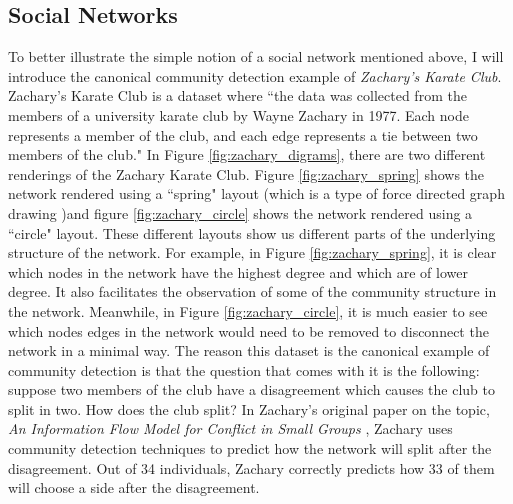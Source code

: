 \subsection{Social Networks}\label{sec:Social Networks}
To better illustrate the simple notion of a social network mentioned above, I will introduce the canonical community detection example of \emph{Zachary's Karate Club}. Zachary's Karate Club is a dataset where ``the data was collected from the members of a university karate club by Wayne Zachary in 1977.  Each node represents a member of the club, and each edge represents a tie between two members of the club." \cite[Metadata]{konect:2017:ucidata-zachary} In Figure \ref{fig:zachary_digrams}, there are two different renderings of the Zachary Karate Club. Figure \ref{fig:zachary_spring} shows the network rendered using a ``spring" layout (which is a type of force directed graph drawing \cite{kobourov12})and figure \ref{fig:zachary_circle} shows the network rendered using a ``circle" layout. These different layouts show us different parts of the underlying structure of the network. For example, in Figure \ref{fig:zachary_spring}, it is clear which nodes in the network have the highest degree and which are of lower degree. It also facilitates the observation of some of the community structure in the network. Meanwhile, in Figure \ref{fig:zachary_circle}, it is much easier to see which nodes edges in the network would need to be removed to disconnect the network in a minimal way. The reason this dataset is the canonical example of community detection is that the question that comes with it is the following: suppose two members of the club have a disagreement which causes the club to split in two. How does the club split? In Zachary's original paper on the topic, \emph{An Information Flow Model for Conflict in Small Groups} \cite{konect:ucidata-zachary}, Zachary uses community detection techniques to predict how the network will split after the disagreement. Out of 34 individuals, Zachary correctly predicts how 33 of them will choose a side after the disagreement.

